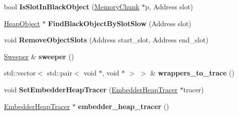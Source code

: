 \begin{DoxyCompactItemize}
\item 
bool {\bfseries Is\+Slot\+In\+Black\+Object} (\hyperlink{classv8_1_1internal_1_1_memory_chunk}{Memory\+Chunk} $\ast$p, Address slot)\hypertarget{classv8_1_1internal_1_1_mark_compact_collector_abd26d4f0510b2537d2b4b09b598a1316}{}\label{classv8_1_1internal_1_1_mark_compact_collector_abd26d4f0510b2537d2b4b09b598a1316}

\item 
\hyperlink{classv8_1_1internal_1_1_heap_object}{Heap\+Object} $\ast$ {\bfseries Find\+Black\+Object\+By\+Slot\+Slow} (Address slot)\hypertarget{classv8_1_1internal_1_1_mark_compact_collector_a0373b8725bf53be5c91b8bb3d7dad971}{}\label{classv8_1_1internal_1_1_mark_compact_collector_a0373b8725bf53be5c91b8bb3d7dad971}

\item 
void {\bfseries Remove\+Object\+Slots} (Address start\+\_\+slot, Address end\+\_\+slot)\hypertarget{classv8_1_1internal_1_1_mark_compact_collector_aa172174f5ecef1a8513726edfb8d8174}{}\label{classv8_1_1internal_1_1_mark_compact_collector_aa172174f5ecef1a8513726edfb8d8174}

\item 
\hyperlink{classv8_1_1internal_1_1_mark_compact_collector_1_1_sweeper}{Sweeper} \& {\bfseries sweeper} ()\hypertarget{classv8_1_1internal_1_1_mark_compact_collector_a3ec56839188e546b9c50d572a98d13c6}{}\label{classv8_1_1internal_1_1_mark_compact_collector_a3ec56839188e546b9c50d572a98d13c6}

\item 
std\+::vector$<$ std\+::pair$<$ void $\ast$, void $\ast$ $>$ $>$ \& {\bfseries wrappers\+\_\+to\+\_\+trace} ()\hypertarget{classv8_1_1internal_1_1_mark_compact_collector_a1f970f4a54306d9a0e417488d786aafd}{}\label{classv8_1_1internal_1_1_mark_compact_collector_a1f970f4a54306d9a0e417488d786aafd}

\item 
void {\bfseries Set\+Embedder\+Heap\+Tracer} (\hyperlink{classv8_1_1_embedder_heap_tracer}{Embedder\+Heap\+Tracer} $\ast$tracer)\hypertarget{classv8_1_1internal_1_1_mark_compact_collector_a44ffc08ac5c96944985d5a0644bf81c2}{}\label{classv8_1_1internal_1_1_mark_compact_collector_a44ffc08ac5c96944985d5a0644bf81c2}

\item 
\hyperlink{classv8_1_1_embedder_heap_tracer}{Embedder\+Heap\+Tracer} $\ast$ {\bfseries embedder\+\_\+heap\+\_\+tracer} ()\hypertarget{classv8_1_1internal_1_1_mark_compact_collector_a0b28c5488e01950abf12ebb74357bda7}{}\label{classv8_1_1internal_1_1_mark_compact_collector_a0b28c5488e01950abf12ebb74357bda7}


\end{DoxyCompactItemize}
